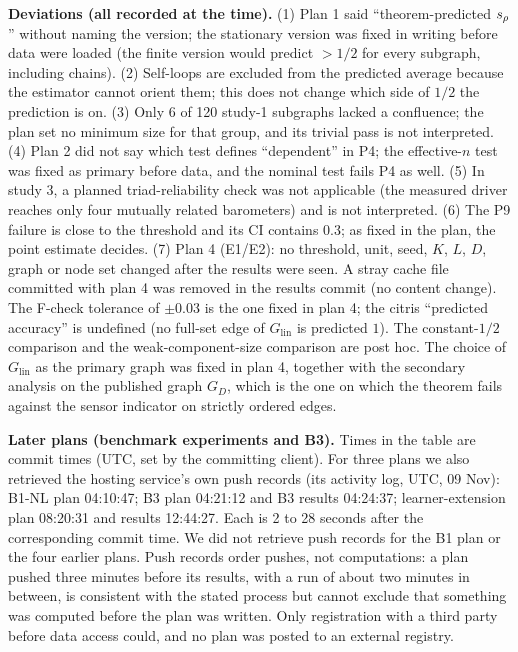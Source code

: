 \textbf{Deviations (all recorded at the time).} (1) Plan 1 said
``theorem-predicted $s_\rho$'' without naming the version; the stationary
version was fixed in writing before data were loaded (the finite version would
predict $>1/2$ for every subgraph, including chains). (2) Self-loops are
excluded from the predicted average because the estimator cannot orient
them; this does not change which side of $1/2$ the prediction is on.
(3) Only 6 of 120 study-1 subgraphs lacked a confluence; the plan set no
minimum size for that group, and its trivial pass is not interpreted. (4) Plan
2 did not say which test defines ``dependent'' in P4; the effective-$n$ test
was fixed as primary before data, and the nominal test fails P4 as well.
(5) In study 3, a planned triad-reliability check was not applicable (the
measured driver reaches only four mutually related barometers) and is not
interpreted. (6) The P9 failure is close to the threshold and its CI contains
$0.3$; as fixed in the plan, the point estimate decides.
(7) Plan 4 (E1/E2): no threshold, unit, seed, $K$, $L$, $D$, graph or node set
changed after the results were seen. A stray cache file committed with plan 4 was removed in the results
commit (no content change). The F-check tolerance of $\pm0.03$ is the one fixed in plan 4; the citris
``predicted accuracy'' is undefined (no full-set edge of $G_{\mathrm{lin}}$ is predicted $1$). The
constant-$1/2$ comparison and the weak-component-size comparison are post hoc. The choice of $G_{\mathrm{lin}}$ as the primary graph was
fixed in plan 4, together with the secondary analysis on the published graph $G_D$, which is the one on which
the theorem fails against the sensor indicator on strictly ordered edges.

\textbf{Later plans (benchmark experiments and B3).} Times in the table are
commit times (UTC, set by the committing client). For three plans we also
retrieved the hosting service's own push records (its activity log, UTC, 09
Nov): B1-NL plan 04:10:47; B3 plan 04:21:12 and B3 results 04:24:37;
learner-extension plan 08:20:31 and results 12:44:27. Each is 2 to 28 seconds
after the corresponding commit time. We did not retrieve push records for the
B1 plan or the four earlier plans. Push records order pushes, not
computations: a plan pushed three minutes before its results, with a run of
about two minutes in between, is consistent with the stated process but cannot
exclude that something was computed before the plan was written. Only
registration with a third party before data access could, and no plan was
posted to an external registry.


